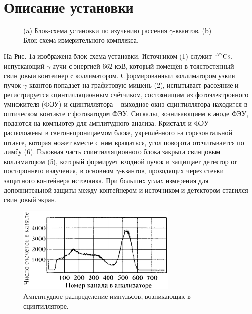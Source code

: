 \documentclass[a4paper,12pt]{article}
\theoremstyle{definition}
\begin{document}
\section*{Описание установки}
\begin{figure}[h]
  \centering
  \caption{(a) Блок-схема установки по изучению рассения $\gamma$-квантов. (b) Блок-схема измерительного комплекса.}
\end{figure}
На Рис. 1а изображена блок-схема установки. Источником (1) служит $\ce{^137Cs}$, испускающий $\gamma$-лучи с энергией $662$ кэВ, который помещён в толстостенный свинцовый контейнер с коллиматором. Сформированный коллиматором узкий пучок $\gamma$-квантов попадает на графитовую мишень (2), испытывает рассеяние и регистрируется сцинтилляционным счётчиком, состоянищим из фотоэлектронного умножителя (ФЭУ) и сцинтиллятора -- выходное окно сцинтиллятора находится в оптическом контакте с фотокатодом ФЭУ. Сигналы, возникающием в аноде ФЭУ, подаются на компьютер для амплитудного анализа. Кристалл и ФЭУ расположены в светонепроницаемом блоке, укреплённого на горизонтальной штанге, которая может вместе с ним вращаться, угол поворота отсчитывается по лимбу (6). Головная часть сцинтилляционного блока закрыта свинцовым коллиматором (5), который формирует входной пучок и защищает детектор от постороннего излучения, в основном $\gamma$-квантов, проходящих через стенки защитного контейнера источника. При больших углах измерения для дополнительной защиты между контейнером и источником и детектором ставился свинцовый экран.
\begin{figure}[h]
\includegraphics[width = 0.7\textwidth]{3.png}
\centering
\caption{Амплитудное распределение импульсов, возникающих в сцинтилляторе.}
\end{figure}\\
\end{document}
